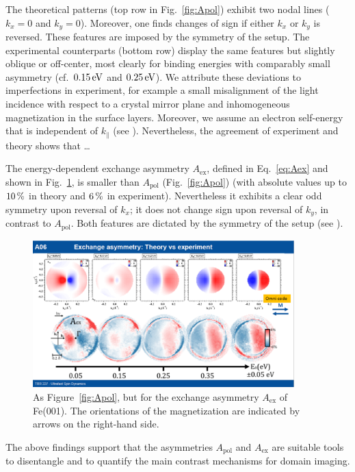 \documentclass[prl,twocolumn,floatfix]{revtex4-2}
\begin{document}
The theoretical patterns (top row in Fig.~\ref{fig:Apol}) exhibit two nodal lines ($k_{x} = 0$ and $k_{y} = 0$). Moreover, one finds changes of sign if either $k_{x}$ or $k_{y}$ is reversed. These features are imposed by the symmetry of the setup. The experimental counterparts (bottom row) display the same features but slightly oblique or off-center, most clearly for binding energies with comparably small asymmetry (cf.\ $\unit[0.15]{eV}$ and $\unit[0.25]{eV}$). We attribute these deviations to imperfections in experiment, for example a small misalignment of the light incidence with respect to a crystal mirror plane and inhomogeneous magnetization in the surface layers. Moreover, we assume an electron self-energy that is independent of $k_{\parallel}$ (see \cite{Supplement}). Nevertheless, the agreement of experiment and theory shows that \ldots {}

The energy-dependent exchange asymmetry $A_{\mathrm{ex}}$, defined in Eq.~\eqref{eq:Aex} and shown in Fig.~\ref{fig:Aex}, is smaller than $A_{\mathrm{pol}}$ (Fig.~\ref{fig:Apol}) (with absolute values up to $\unit[10]{\%}$ in theory and $\unit[6]{\%}$ in experiment). Nevertheless it exhibits a clear odd symmetry upon reversal of $k_{x}$; it does not change sign upon reversal of $k_{y}$, in contrast to $A_{\mathrm{pol}}$. Both features are dictated by the symmetry of the setup (see \cite{Supplement}).

\begin{figure}
    \centering
    \includegraphics[width = 0.9\textwidth]{Aex}
    \caption{As Figure~\ref{fig:Apol}, but for the exchange asymmetry $A_{\mathrm{ex}}$ of Fe(001). The orientations of the magnetization are indicated by arrows on the right-hand side.}
    \label{fig:Aex}
\end{figure}

The above findings support that the asymmetries $A_{\mathrm{pol}}$ and $A_{\mathrm{ex}}$ are suitable tools to disentangle and to quantify the main contrast mechanisms for domain imaging. 
\end{document}
